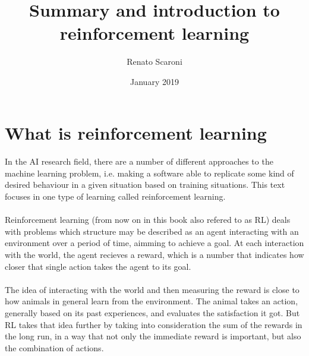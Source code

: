 \documentclass{article}
\title{Summary and introduction to reinforcement learning}
\author{Renato Scaroni}
\date{January 2019}
\begin{document}
\maketitle

\section{What is reinforcement learning}


\paragraph{}
In the AI research field, there are a number of different approaches to the machine learning problem, i.e. making a software able to replicate some kind of desired behaviour in a given situation based on training situations. This text focuses in one type of learning called reinforcement learning.

\paragraph{}
Reinforcement learning (from now on in this book also refered to as RL) deals with problems which structure may be described as an agent interacting with an environment over a period of time, aimming to achieve a goal. At each interaction with the world, the agent recieves a reward, which is a number that indicates how closer that single action takes the agent to its goal.

\paragraph{}
The idea of interacting with the world and then measuring the reward is close to how animals in general learn from the environment. The animal takes an action, generally based on its past experiences, and evaluates the satisfaction it got. But RL takes that idea further by taking into consideration the sum of the rewards in the long run, in a way that not only the immediate reward is important, but also the combination of actions.
\end{document}
